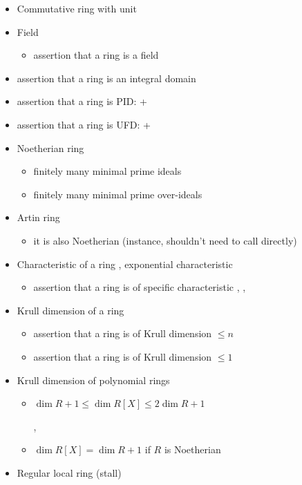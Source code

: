 \begin{itemize}
\item
Commutative ring with unit 
\item
Field 
\begin{itemize}
\item
assertion that a ring is a field 
\end{itemize}
\item
assertion that a ring is an integral domain 
\item
assertion that a ring is PID:  + 
\item
assertion that a ring is UFD:  + 
\item
Noetherian ring 
\begin{itemize}
\item
finitely many minimal prime ideals
\item
finitely many minimal prime over-ideals
\end{itemize}
\item
Artin ring 
\begin{itemize}
\item
it is also Noetherian 
(instance, shouldn't need to call directly)
\end{itemize}
\item
Characteristic of a ring , exponential characteristic 
\begin{itemize}
\item
assertion that a ring is of specific characteristic
, , 
\end{itemize}
\item
Krull dimension of a ring 
\begin{itemize}
\item
assertion that a ring is of Krull dimension $\leq n$
\item
assertion that a ring is of Krull dimension $\leq 1$
\end{itemize}
\item
Krull dimension of polynomial rings
\begin{itemize}
\item
$\dim R+1\leq\dim R[X]\leq 2\dim R+1$

,
\item
$\dim R[X]=\dim R+1$ if $R$ is Noetherian
\end{itemize}
\item
Regular local ring  (stall)
\end{itemize}

